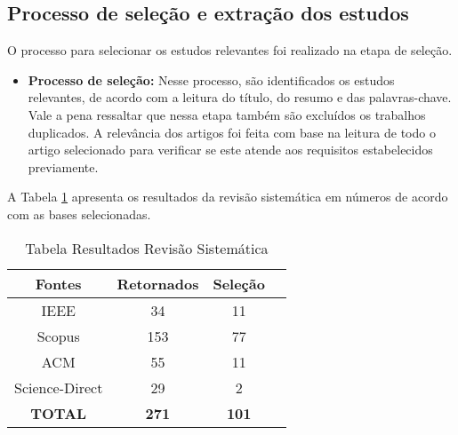 \subsection{Processo de seleção e extração dos estudos}

O processo para selecionar os estudos relevantes foi realizado na etapa de seleção.

\begin{itemize}
    \item \textbf{Processo de seleção:} Nesse processo, são identificados os estudos relevantes, de
acordo com a leitura do título, do resumo e das palavras-chave. Vale a pena ressaltar
que nessa etapa também são excluídos os trabalhos duplicados. A relevância dos artigos foi feita com base na
leitura de todo o artigo selecionado para verificar se este atende aos requisitos estabelecidos previamente.
 
\end{itemize}

A Tabela \ref{tab:resultados} apresenta os resultados da revisão sistemática em números de acordo com as bases selecionadas. 

\begin{table}[htbp]
\centering
\caption{Tabela Resultados Revisão Sistemática}
\label{tab:resultados}
\begin{tabular}{|c|c|c|c|}
\hline
\textbf{Fontes} & \textbf{Retornados} & \textbf{Seleção} \\ \hline
IEEE & 34 &  11  \\ \hline
Scopus & 153 &  77  \\ \hline
ACM & 55 &  11  \\ \hline
Science-Direct & 29 & 2  \\ \hline
\textbf{TOTAL} & \textbf{271} & \textbf{101} \\ \hline
\end{tabular}
\end{table}
